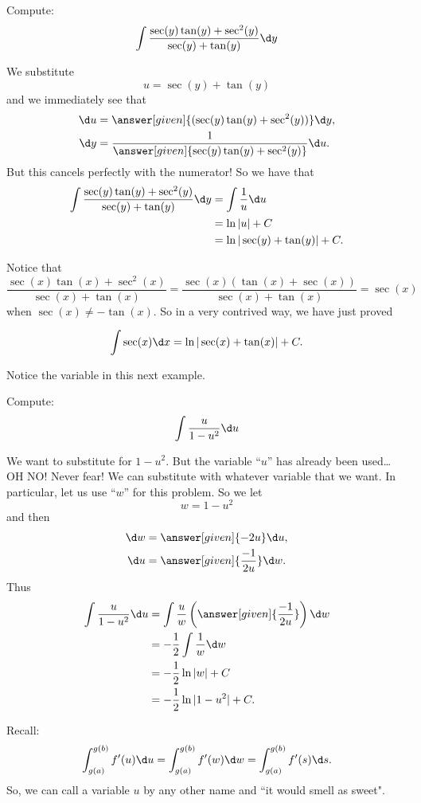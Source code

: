 \documentclass{ximera}
\begin{document}
\begin{example}
Compute:
\[
\int \frac{\sec(y) \tan(y) + \sec^2(y)}{\sec(y) + \tan(y)} \d y
\]
\begin{explanation}
We substitute
\[
u = \sec(y) + \tan(y)
\]
and we immediately see that
\begin{align*}
  \d u &= \answer[given]{(\sec(y) \tan(y) + \sec^2(y))} \d y,\\
  \d y &= \frac{1}{\answer[given]{\sec(y) \tan(y) + \sec^2(y)}} \d u.
\end{align*}
But this cancels perfectly with the numerator!  
So we have that
\begin{align*}
\int \frac{\sec(y) \tan(y) + \sec^2(y)}{\sec(y) + \tan(y)} \d y &= \int \frac{1}{u} \d u  \\
&= \ln|u| + C  \\
&= \ln| \sec(y) + \tan(y) | + C.
\end{align*}
\end{explanation}
\end{example}



Notice that 
\[
\frac{\sec(x) \tan(x) + \sec^2(x)}{\sec(x) + \tan(x)} = \frac{\sec(x) (\tan(x) + \sec(x))}{\sec(x) + \tan(x)} = \sec(x)
\]
when $\sec(x) \neq - \tan(x)$.  
So in a very contrived way, we have just proved

\begin{theorem}
\[
\int \sec(x) \d x = \ln|\sec(x) + \tan(x)| + C.
\]
\end{theorem}


Notice the variable in this next example.


\begin{example}\label{key example}
Compute:
\[
\int \frac{u}{1-u^2} \d u
\]
\begin{explanation}
We want to substitute for $1-u^2$.  
But the variable ``$u$'' has already been used\dots OH NO!
Never fear! We can substitute with whatever variable that we want.  
In particular, let us use ``$w$'' for this problem.  
So we let
\[
w = 1 - u^2
\]
and then
\begin{align*}
  \d w &= \answer[given]{-2u} \d u,\\
  \d u &= \answer[given]{\frac{-1}{2u}} \d w.
\end{align*}
Thus
\begin{align*}
\int \frac{u}{1-u^2} \d u &= \int \frac{u}{w} \left( \answer[given]{\frac{-1}{2u}} \right) \d w  \\
&= - \frac{1}{2} \int \frac{1}{w} \d w  \\
&= - \frac{1}{2} \ln|w| + C  \\
&= - \frac{1}{2} \ln|1-u^2| + C.
\end{align*}
\end{explanation}
Recall:
\[
\int_{g(a)}^{g(b)} f'(u) \d u=\int_{g(a)}^{g(b)} f'(w) \d w=\int_{g(a)}^{g(b)} f'(s) \d s.
\]
So, we can call a variable $u$ by any other name and ``it would smell as sweet".

\end{example}
\end{document}
